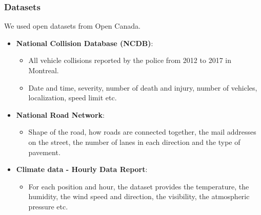 \documentclass[slidestop,compress,red,mathserif]{beamer}
\begin{document}

\begin{frame}
\frametitle{Datasets}

\begin{footnotesize}
We used open datasets from Open Canada.

\begin{itemize}
\item[] \textbf{National Collision Database (NCDB)}:
  \begin{itemize}
  	\item All vehicle collisions reported by the police from 2012 to 2017 in Montreal.
  	\item Date and time, severity, number of death and injury, number of vehicles, localization, speed limit etc.
  \end{itemize}
\item[] \textbf{National Road Network}:
  \begin{itemize}
    \item Shape of the road, how roads are
connected together, the mail addresses on the street, the number of lanes in each direction and the
type of pavement.
  \end{itemize}
\item[] \textbf{Climate data - Hourly Data Report}:
  \begin{itemize}
    \item For each position and hour, the dataset provides the temperature, the humidity, the wind speed and direction, the visibility, the atmospheric pressure etc.
  \end{itemize}
\end{itemize}

\end{footnotesize}

\end{frame}

\end{document}
